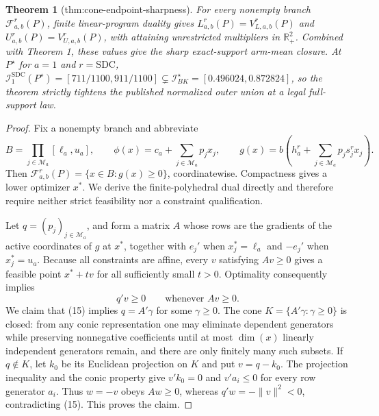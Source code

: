 \documentclass{article}
\newtheorem{theorem}{Theorem}
\begin{document}
\begin{theorem}[thm:cone-endpoint-sharpness]\label{thm:cone-endpoint-sharpness}
For every nonempty branch \(\mathcal F_{a,b}^r(P)\), finite linear-program duality gives \(L_{a,b}^r(P)=V_{L,a,b}^r(P)\) and \(U_{a,b}^r(P)=V_{U,a,b}^r(P)\), with attaining unrestricted multipliers in \(\mathbb R_+^2\). Combined with Theorem 1, these values give the sharp exact-support arm-mean closure. At \(P^\star\) for \(a=1\) and \(r=\mathrm{SDC}\), \(\mathcal I_1^{\mathrm{SDC}}(P^\star)=[711/1100,911/1100]\subsetneq\mathcal I_{BK}^\star=[0.496024,0.872824]\), so the theorem strictly tightens the published normalized outer union at a legal full-support law.
\end{theorem}
\begin{proof}
Fix a nonempty branch and abbreviate
\[
 B=\prod_{j\in\mathcal M_a}[\ell_a,u_a],\qquad
 \phi(x)=c_a+\sum_{j\in\mathcal M_a}p_jx_j,\qquad
 g(x)=b\left(h_a^r+\sum_{j\in\mathcal M_a}p_js_j^rx_j\right).
\]
Then \(\mathcal F_{a,b}^r(P)=\{x\in B:g(x)\ge0\}\), coordinatewise.  Compactness gives a lower optimizer \(x^*\).  We derive the finite-polyhedral dual directly and therefore require neither strict feasibility nor a constraint qualification.

Let \(q=(p_j)_{j\in\mathcal M_a}\), and form a matrix \(A\) whose rows are the gradients of the active coordinates of \(g\) at \(x^*\), together with \(e_j'\) when \(x_j^*=\ell_a\) and \(-e_j'\) when \(x_j^*=u_a\).  Because all constraints are affine, every \(v\) satisfying \(Av\ge0\) gives a feasible point \(x^*+tv\) for all sufficiently small \(t>0\).  Optimality consequently implies
\[
 q'v\ge0\qquad\text{whenever }Av\ge0.                                        \tag{15}
\]
We claim that (15) implies \(q=A'\gamma\) for some \(\gamma\ge0\).  The cone \(K=\{A'\gamma:\gamma\ge0\}\) is closed: from any conic representation one may eliminate dependent generators while preserving nonnegative coefficients until at most \(\dim(x)\) linearly independent generators remain, and there are only finitely many such subsets.  If \(q\notin K\), let \(k_0\) be its Euclidean projection on \(K\) and put \(v=q-k_0\).  The projection inequality and the conic property give \(v'k_0=0\) and \(v'a_i\le0\) for every row generator \(a_i\).  Thus \(w=-v\) obeys \(Aw\ge0\), whereas \(q'w=-\|v\|^2<0\), contradicting (15).  This proves the claim.


\end{proof}
\end{document}
